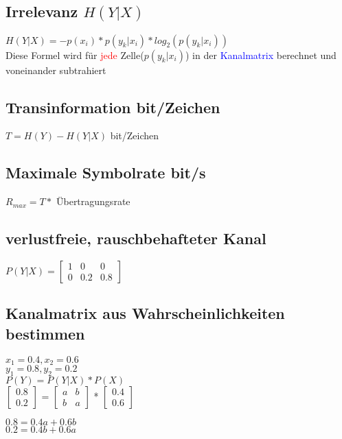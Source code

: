 \subsection{Irrelevanz $H(Y|X)$}


\colorbox{lightlightgrey}{$H(Y|X) = -p(x_i)*p(y_k|x_i) * log_2(p(y_k|x_i))$}\\
Diese Formel wird für \textcolor{red}{jede} Zelle($p(y_k|x_i)$) in der \textcolor{blue}{Kanalmatrix} berechnet und voneinander subtrahiert
\subsection{Transinformation bit/Zeichen}
\colorbox{lightlightgrey}{$T = H(Y) - H(Y|X)$ bit/Zeichen}



\subsection{Maximale Symbolrate bit/s}
$R_{max} = T *$ Übertragungsrate
\subsection{verlustfreie, rauschbehafteter Kanal}
$P(Y|X) = \begin{bmatrix}
              1 & 0 & 0\\
              0 & 0.2 & 0.8
\end{bmatrix}$



\subsection{Kanalmatrix aus Wahrscheinlichkeiten bestimmen}
\begin{minipage}[t]{0.15\textwidth}
    $x_1 = 0.4, x_2 = 0.6$\\
    $y_1 = 0.8, y_2 = 0.2$\\
    \colorbox{lightlightgrey}{$P(Y) = P(Y|X) * P(X)$}\\
    \colorbox{lightlightgrey}{$\begin{bmatrix}
                                   0.8\\
                                   0.2
    \end{bmatrix}$ =
    $\begin{bmatrix}
         a & b\\
         b & a
    \end{bmatrix}$ *
    $\begin{bmatrix}
         0.4\\
         0.6
    \end{bmatrix}$}
\end{minipage}
\hfill
\begin{minipage}[t]{0.15\textwidth}
    $0.8 = 0.4a + 0.6b$\\
    $0.2 = 0.4b + 0.6a$\\
\end{minipage}


\vfill
$$
\columnbreak